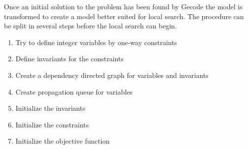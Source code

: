 Once an initial solution to the problem has been found by Gecode the model is transformed to create a model better 
suited for local search. The procedure can be split in several steps before the local search can begin. 
\begin{enumerate}
 \item Try to define integer variables by one-way constraints
 \item Define invariants for the constraints
 \item Create a dependency directed graph for variables and invariants
 \item Create propagation queue for variables
 \item Initialize the invariants
 \item Initialize the constraints
 \item Initialize the objective function
\end{enumerate}